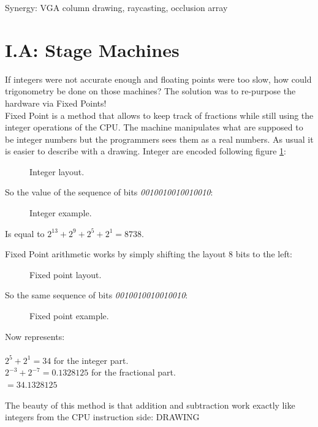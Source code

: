 \documentclass[book.tex]{subfiles}
\begin{document}
   Synergy: VGA column drawing, raycasting, occlusion array

\section{I.A: Stage Machines}
 
If integers were not accurate enough and floating points were too slow, how could trigonometry be done on those machines? The solution was to re-purpose the hardware via Fixed Points!\\
Fixed Point is a method that allows to keep track of fractions while still using the integer operations of the CPU. The machine manipulates what are supposed to be integer numbers but the programmers sees them as a real numbers. As usual it is easier to describe with a drawing. Integer are encoded following figure \ref{fig:int_layout}:
\begin{figure}[H]
\centering
 
 \caption{Integer layout.} \label{fig:int_layout}
 \end{figure}

So the value of the sequence of bits \emph{0010010010010010}:
\begin{figure}[H]
\centering

 \caption{Integer example.} \label{fig:mips}
 \end{figure}

 Is equal to $ 2^{13} + 2^9 + 2^5 + 2^1 =  8738 $.

\bigskip


Fixed Point arithmetic works by simply shifting the layout 8 bits to the left:
\begin{figure}[H]
 \centering
  
 \caption{Fixed point layout.} \label{fig:mips}
\end{figure}

So the same sequence of bits \emph{0010010010010010}:
\begin{figure}[H]
 \centering
   
  \caption{Fixed point example.} \label{fig:mips}
\end{figure} 

Now represents:\\
\\
$ 2^5 + 2^1 = 34 $ for the integer part.\\
$ 2^{-3}+2^{-7} = 0.1328125 $ for the fractional part.\\
$ = 34.1328125$\\

\bigskip

The beauty of this method is that addition and subtraction work exactly like integers from the CPU instruction side:
  \bigskip
  DRAWING
  \bigskip
\end{document}
